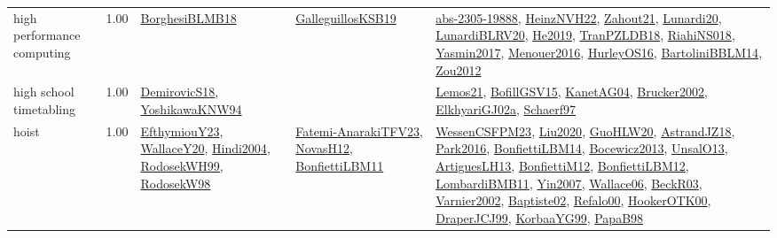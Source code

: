 {\begin{longtable}{p{3cm}r>{\raggedright\arraybackslash}p{6cm}>{\raggedright\arraybackslash}p{6cm}>{\raggedright\arraybackslash}p{8cm}}
\index{high performance computing}\index{ApplicationAreas!high performance computing}high performance computing &  1.00 & \hyperref[detail:BorghesiBLMB18]{BorghesiBLMB18} & \hyperref[detail:GalleguillosKSB19]{GalleguillosKSB19} & \hyperref[detail:abs-2305-19888]{abs-2305-19888}, \hyperref[detail:HeinzNVH22]{HeinzNVH22}, \hyperref[detail:Zahout21]{Zahout21}, \hyperref[detail:Lunardi20]{Lunardi20}, \hyperref[detail:LunardiBLRV20]{LunardiBLRV20}, \hyperref[detail:He2019]{He2019}, \hyperref[detail:TranPZLDB18]{TranPZLDB18}, \hyperref[detail:RiahiNS018]{RiahiNS018}, \hyperref[detail:Yasmin2017]{Yasmin2017}, \hyperref[detail:Menouer2016]{Menouer2016}, \hyperref[detail:HurleyOS16]{HurleyOS16}, \hyperref[detail:BartoliniBBLM14]{BartoliniBBLM14}, \hyperref[detail:Zou2012]{Zou2012}\\
\index{high school timetabling}\index{ApplicationAreas!high school timetabling}high school timetabling &  1.00 & \hyperref[detail:DemirovicS18]{DemirovicS18}, \hyperref[detail:YoshikawaKNW94]{YoshikawaKNW94} &  & \hyperref[detail:Lemos21]{Lemos21}, \hyperref[detail:BofillGSV15]{BofillGSV15}, \hyperref[detail:KanetAG04]{KanetAG04}, \hyperref[detail:Brucker2002]{Brucker2002}, \hyperref[detail:ElkhyariGJ02a]{ElkhyariGJ02a}, \hyperref[detail:Schaerf97]{Schaerf97}\\
\index{hoist}\index{ApplicationAreas!hoist}hoist &  1.00 & \hyperref[detail:EfthymiouY23]{EfthymiouY23}, \hyperref[detail:WallaceY20]{WallaceY20}, \hyperref[detail:Hindi2004]{Hindi2004}, \hyperref[detail:RodosekWH99]{RodosekWH99}, \hyperref[detail:RodosekW98]{RodosekW98} & \hyperref[detail:Fatemi-AnarakiTFV23]{Fatemi-AnarakiTFV23}, \hyperref[detail:NovasH12]{NovasH12}, \hyperref[detail:BonfiettiLBM11]{BonfiettiLBM11} & \hyperref[detail:WessenCSFPM23]{WessenCSFPM23}, \hyperref[detail:Liu2020]{Liu2020}, \hyperref[detail:GuoHLW20]{GuoHLW20}, \hyperref[detail:AstrandJZ18]{AstrandJZ18}, \hyperref[detail:Park2016]{Park2016}, \hyperref[detail:BonfiettiLBM14]{BonfiettiLBM14}, \hyperref[detail:Bocewicz2013]{Bocewicz2013}, \hyperref[detail:UnsalO13]{UnsalO13}, \hyperref[detail:ArtiguesLH13]{ArtiguesLH13}, \hyperref[detail:BonfiettiM12]{BonfiettiM12}, \hyperref[detail:BonfiettiLBM12]{BonfiettiLBM12}, \hyperref[detail:LombardiBMB11]{LombardiBMB11}, \hyperref[detail:Yin2007]{Yin2007}, \hyperref[detail:Wallace06]{Wallace06}, \hyperref[detail:BeckR03]{BeckR03}, \hyperref[detail:Varnier2002]{Varnier2002}, \hyperref[detail:Baptiste02]{Baptiste02}, \hyperref[detail:Refalo00]{Refalo00}, \hyperref[detail:HookerOTK00]{HookerOTK00}, \hyperref[detail:DraperJCJ99]{DraperJCJ99}, \hyperref[detail:KorbaaYG99]{KorbaaYG99}, \hyperref[detail:PapaB98]{PapaB98}\\

\end{longtable}}
